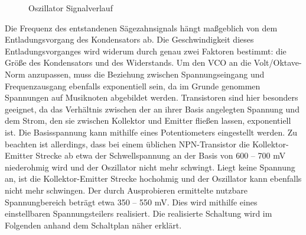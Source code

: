 \begin{figure}[h]
	\centering
	\setlength{\fboxsep}{1pt} %
	\setlength{\fboxrule}{1pt} %
	\caption{Oszillator Signalverlauf}
	\label{fig:Oszillator_Signalverlauf}
\end{figure}

\newpage

Die Frequenz des entstandenen Sägezahnsignals hängt maßgeblich von dem Entladungsvorgang des Kondensators ab.
Die Geschwindigkeit dieses Entladungsvorganges wird widerum durch genau zwei Faktoren bestimmt: die Größe des Kondensators und des Widerstands.
Um den VCO an die Volt/Oktave-Norm anzupassen, muss die Beziehung zwischen Spannungseingang und Frequenzausgang ebenfalls exponentiell sein, da im Grunde genommen Spannungen auf Musiknoten abgebildet werden. 
Transistoren sind hier besonders geeignet, da das Verhältnis zwischen der an ihrer Basis angelegten Spannung und dem Strom, den sie zwischen Kollektor und Emitter fließen lassen, exponentiell ist.
Die Basisspannung kann mithilfe eines Potentiometers eingestellt werden.
Zu beachten ist allerdings, dass bei einem üblichen NPN-Transistor die Kollektor-Emitter Strecke ab etwa der Schwellspannung an der Basis von 600 -- 700 mV niederohmig wird und der Oszillator nicht mehr schwingt. 
Liegt keine Spannung an, ist die Kollektor-Emitter Strecke hochohmig und der Oszillator kann ebenfalls nicht mehr schwingen.
Der durch Ausprobieren ermittelte nutzbare Spannungbereich beträgt etwa 350 -- 550 mV.
Dies wird mithilfe eines einstellbaren Spannungsteilers realisiert.
Die realisierte Schaltung wird im Folgenden anhand dem Schaltplan näher erklärt.


